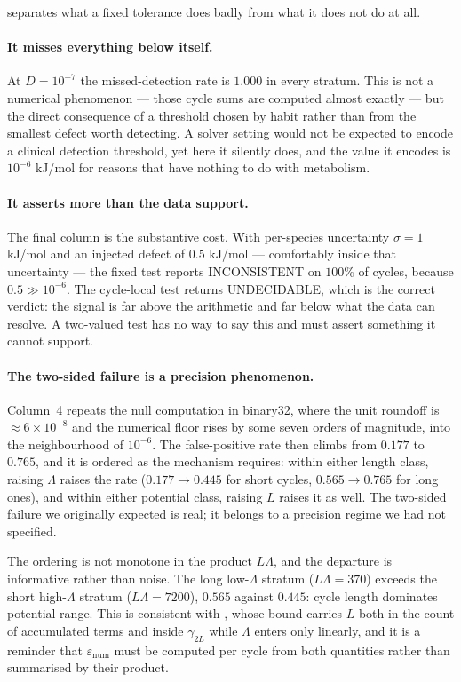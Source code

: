 \documentclass[11pt,twocolumn,a4paper]{article}
\theoremstyle{pstyle}
\theoremstyle{definition}
\theoremstyle{remark}
\newcommand{\eps}{\varepsilon}
\newcommand{\epsnum}{\eps_{\mathrm{num}}}
\begin{document}
 separates what a fixed tolerance does badly from what it
does not do at all.

\paragraph{It misses everything below itself.} At $D=10^{-7}$ the
missed-detection rate is $1.000$ in every stratum. This is not a
numerical phenomenon --- those cycle sums are computed almost exactly ---
but the direct consequence of a threshold chosen by habit rather than
from the smallest defect worth detecting. A solver setting would not be
expected to encode a clinical detection threshold, yet here it silently
does, and the value it encodes is $10^{-6}$ kJ/mol for reasons that have
nothing to do with metabolism.

\paragraph{It asserts more than the data support.} The final column is
the substantive cost. With per-species uncertainty $\sigma=1$ kJ/mol and
an injected defect of $0.5$ kJ/mol --- comfortably inside that
uncertainty --- the fixed test reports \textsf{INCONSISTENT} on
$100\%$ of cycles, because $0.5 \gg 10^{-6}$. The cycle-local test
returns \textsf{UNDECIDABLE}, which is the correct verdict: the signal
is far above the arithmetic and far below what the data can resolve. A
two-valued test has no way to say this and must assert something it
cannot support.

\paragraph{The two-sided failure is a precision phenomenon.} Column~4
repeats the null computation in binary32, where the unit roundoff is
$\approx6\times10^{-8}$ and the numerical floor rises by some seven
orders of magnitude, into the neighbourhood of $10^{-6}$. The
false-positive rate then climbs from $0.177$ to $0.765$, and it is
ordered as the mechanism requires: within either length class, raising
$\Lambda$ raises the rate ($0.177\to0.445$ for short cycles,
$0.565\to0.765$ for long ones), and within either potential class,
raising $L$ raises it as well. The two-sided failure we originally
expected is real; it belongs to a precision regime we had not
specified.

The ordering is not monotone in the product $L\Lambda$, and the
departure is informative rather than noise. The long low-$\Lambda$
stratum ($L\Lambda=370$) exceeds the short high-$\Lambda$ stratum
($L\Lambda=7200$), $0.565$ against $0.445$: cycle length dominates
potential range. This is consistent with , whose
bound carries $L$ both in the count of accumulated terms and inside
$\gamma_{2L}$ while $\Lambda$ enters only linearly, and it is a
reminder that $\epsnum$ must be computed per cycle from both quantities
rather than summarised by their product.
\end{document}
